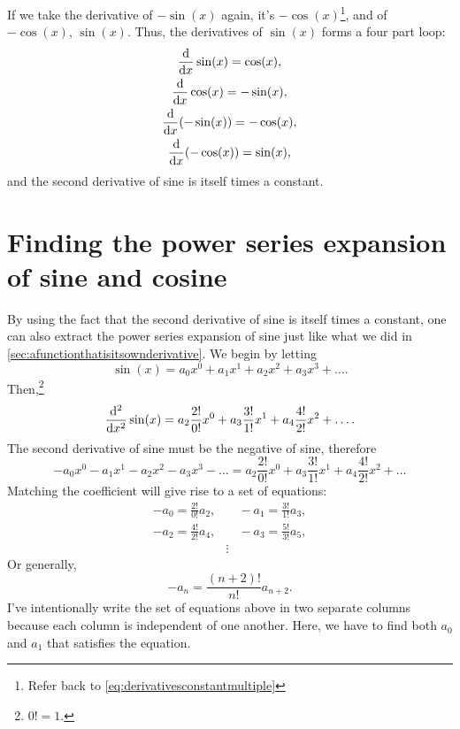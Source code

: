 If we take the derivative of $-\sin(x)$ again, it's $-\cos(x)$\footnote{Refer back to \cref{eq:derivativesconstantmultiple}}, and of $-\cos(x)$, $\sin(x)$. Thus, the derivatives of $\sin(x)$ forms a four part loop:
\begin{gather*}
    \dv{x}\sin(x) = \cos(x), \\
    \dv{x}\cos(x) = -\sin(x), \\
    \dv{x}(-\sin(x)) = -\cos(x), \\
    \dv{x}(-\cos(x)) = \sin(x),
\end{gather*}
and the second derivative of sine is itself times a constant.

\section{Finding the power series expansion of sine and cosine}
\label{sec:taylorseriesforsineandcosine}

By using the fact that the second derivative of sine is itself times a constant, one can also extract the power series expansion of sine just like what we did in \cref{sec:afunctionthatisitsownderivative}. We begin by letting
\begin{equation}
    \sin(x) = a_0x^0 + a_1x^1 + a_2x^2 + a_3x^3 + \dots. \label{eq:taylorseriessineproof1}
\end{equation}
Then,\footnote{$0! = 1$.}
\begin{equation}
    \dv[2]{x}\sin(x) = a_2\frac{2!}{0!}x^0 + a_3\frac{3!}{1!}x^1 + a_4\frac{4!}{2!}x^2 + \dots. \label{eq:taylorseriessineproof2}
\end{equation}
The second derivative of sine must be the negative of sine, therefore
\begin{equation*}
    -a_0x^0 - a_1x^1 - a_2x^2 - a_3x^3 - \dots = a_2\frac{2!}{0!}x^0 + a_3\frac{3!}{1!}x^1 + a_4\frac{4!}{2!}x^2 + \dots
\end{equation*}
Matching the coefficient will give rise to a set of equations:
\begin{align*}
    -a_0 = \frac{2!}{0!}a_2, &\quad -a_1 = \frac{3!}{1!}a_3, \\
    -a_2 = \frac{4!}{2!}a_4, &\quad -a_3 = \frac{5!}{3!}a_5, \\
    &\vdots
\end{align*}
Or generally,
\begin{equation*}
    -a_n = \frac{(n + 2)!}{n!}a_{n + 2}.
\end{equation*}
I've intentionally write the set of equations above in two separate columns because each column is independent of one another. Here, we have to find both $a_0$ and $a_1$ that satisfies the equation.

